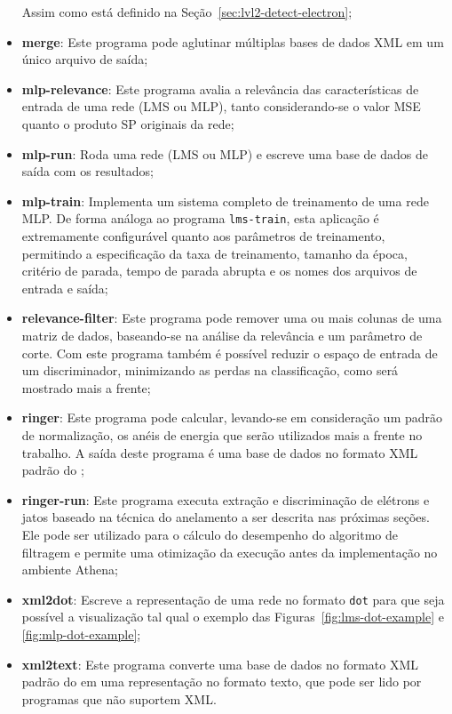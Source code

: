 \begin{itemize}
Assim como está definido na Seção~\ref{sec:lvl2-detect-electron};

\item \textbf{merge}: Este programa pode aglutinar múltiplas bases de dados
XML em um único arquivo de saída; 

\item \textbf{mlp-relevance}: Este programa avalia a relevância das
características de entrada de uma rede (LMS ou MLP), tanto considerando-se o
valor MSE quanto o produto SP originais da rede;

\item \textbf{mlp-run}: Roda uma rede (LMS ou MLP) e escreve uma base de dados
de saída com os resultados;

\item \textbf{mlp-train}: Implementa um sistema completo de treinamento de 
uma rede MLP. De forma análoga ao programa \texttt{lms-train}, esta aplicação
é extremamente configurável quanto aos parâmetros de treinamento, permitindo a
especificação da taxa de treinamento, tamanho da época, critério de parada,
tempo de parada abrupta e os nomes dos arquivos de entrada e saída;

\item \textbf{relevance-filter}: Este programa pode remover uma ou mais
colunas de uma matriz de dados, baseando-se na análise da relevância e um
parâmetro de corte. Com este programa também é possível reduzir o espaço de
entrada de um discriminador, minimizando as perdas na classificação, como será
mostrado mais a frente;

\item \textbf{ringer}: Este programa pode calcular, levando-se em consideração
um padrão de normalização, os anéis de energia que serão utilizados mais a
frente no trabalho. A saída deste programa é uma base de dados no formato XML
padrão do ;

\item \textbf{ringer-run}: Este programa executa extração e discriminação de
elétrons e jatos baseado na técnica do anelamento a ser descrita nas próximas
seções. Ele pode ser utilizado para o cálculo do desempenho do algoritmo de
filtragem  e permite uma otimização da execução antes da
implementação no ambiente Athena;

\item \textbf{xml2dot}: Escreve a representação de uma rede no formato
\texttt{dot} para que seja possível a visualização tal qual o exemplo das
Figuras~\ref{fig:lms-dot-example} e \ref{fig:mlp-dot-example};

\item \textbf{xml2text}: Este programa converte uma base de dados no formato
XML padrão do  em uma representação no formato texto, que
pode ser lido por programas que não suportem XML.
\end{itemize}

